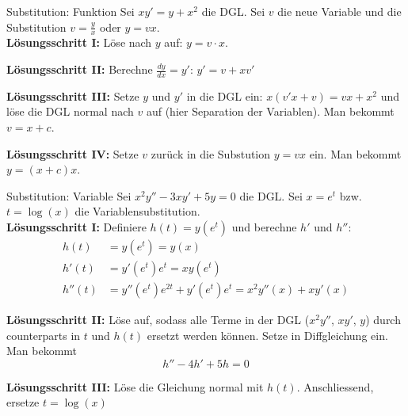 \begin{Beispiel}{Substitution: Funktion}{}
		Sei $xy'=y+x^2$ die DGL. Sei $v$ die neue Variable und die Substitution $v = \frac{y}{x}$ oder $y=vx$.\\
	
	\textbf{Lösungsschritt I:} Löse nach $y$ auf: $y = v \cdot x$.
	
	\textbf{Lösungsschritt II:} Berechne $\frac{dy}{dx} = y'$: $y' = v + x v'$
	
	\textbf{Lösungsschritt III:} Setze $y$ und $y'$ in die DGL ein: $x(v'x+v)=vx+x^2$ und löse die DGL normal nach $v$ auf (hier Separation der Variablen). Man bekommt $v=x+c$.
	
	\textbf{Lösungsschritt IV:} Setze $v$ zurück in die Substution $y=vx$ ein. Man bekommt $y=(x+c)x$.
\end{Beispiel}

\begin{Beispiel}{Substitution: Variable}{}
		Sei $x^2y'' - 3xy' + 5y = 0$ die DGL. Sei $x=e^t$ bzw. $t = \log(x)$ die Variablensubstitution.\\
	
	\textbf{Lösungsschritt I:} Definiere $h(t) = y(e^t)$ und berechne $h'$ und $h''$:
	\begin{align*}
		h(t) &= y(e^t) = y(x)\\
		h'(t) &= y'(e^t) e^t = xy(e^t)\\
		h''(t) &= y''(e^t)e^{2t}+y'(e^t)e^t = x^2y''(x)+xy'(x)
	\end{align*}
	
	\textbf{Lösungsschritt II:} Löse auf, sodass alle Terme in der DGL ($x^2y''$, $xy'$, $y$) durch counterparts in $t$ und $h(t)$ ersetzt werden können. Setze in Diffgleichung ein. Man bekommt
	\[
		h'' - 4h' + 5h = 0
	\]
	
	\textbf{Lösungsschritt III:} Löse die Gleichung normal mit $h(t)$. Anschliessend, ersetze $t=\log(x)$
\end{Beispiel}

